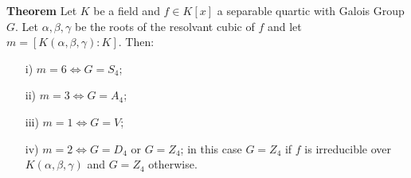 \textbf{Theorem} \hspace{3mm} Let \(K\) be a field and \(f \in K[x]\) a separable quartic with Galois Group \(G\). Let \(\alpha, \beta, \gamma\) be the roots of the resolvant cubic of \(f\) and let \(m= [K(\alpha, \beta, \gamma) : K]\). Then:
\begin{enumerate}
\item[i)] \(m=6 \Longleftrightarrow G=S_4\);
\item[ii)] \(m=3 \Longleftrightarrow G=A_4\);
\item[iii)] \(m=1 \Longleftrightarrow G=V\);
  \item[iv)] \(m=2 \Longleftrightarrow G=D_4\) or \(G=Z_4\); in this case \(G=Z_4\) if \(f\) is irreducible over \(K(\alpha, \beta, \gamma)\) and \(G=Z_4\) otherwise.
\end{enumerate}









